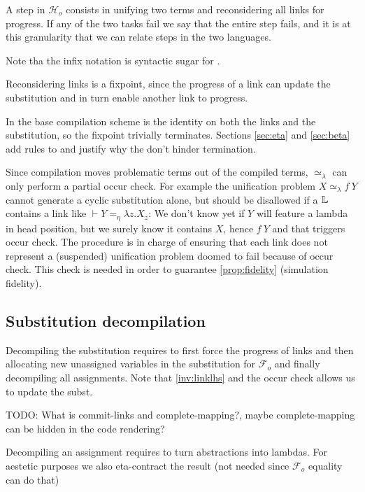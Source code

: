 \documentclass[sigconf,natbib=false,review]{acmart}
\newcommand{\UnifRel}{\ensuremath{\simeq}}
\newcommand{\Ue}{\ensuremath{\UnifRel_\lambda}\xspace}
\newcommand{\Fo}{\ensuremath{\mathcal{F}_{\!o}\xspace}} %
\newcommand{\Ho}{\ensuremath{\mathcal{H}_o}\xspace}
\newcommand{\linketaM}[3]{\ensuremath{#1 \vdash #2 =_\eta #3}}
\begin{document}
A step in \Ho consists in unifying two terms and reconsidering all
links for progress. If any of the two tasks fail we say that the entire step
fails, and it is at this granularity that we can relate steps in the
two languages.




\noindent
Note tha the infix notation \elpiIn{((A ~\Ue~B) C D)} is syntactic sugar for
\elpiIn{((~\Ue\!\!\!~) A B C D)}.

Reconsidering links is a fixpoint, since the progress of a link can update the
substitution and in turn enable another link to progress.



\noindent
In the base compilation scheme  is the identity
on both the links and the substitution, so the fixpoint trivially terminates.
Sections \ref{sec:eta} and \ref{sec:beta} add rules to 
and justify why the don't hinder termination.

Since compilation moves problematic terms out of the compiled terms,
\Ue{} can only perform a partial occur check. For example the
unification problem $X \Ue f~Y$ cannot generate a cyclic substitution alone,
but should be disallowed if a $\mathbb{L}$ contains a link like
$\linketaM{}{Y}{\lambda z.X_z}$: We don't know yet if $Y$ will feature
a lambda in head position, but we surely know it contains $X$, hence
$f~Y$ and that triggers occur check.
The procedure  is in charge of ensuring that
each link does not represent a (suspended) unification problem doomed
to fail because of occur check. This check is needed in order to
guarantee \cref{prop:fidelity} (simulation fidelity).

\subsection{Substitution decompilation}

Decompiling the substitution requires to first force the
progress of links and then allocating new unassigned variables
in the substitution for \Fo{} and finally decompiling all
assignments. Note that \cref{inv:linklhs} and the
occur check allows us to update the subst.




TODO: What is commit-links and complete-mapping?, maybe complete-mapping can be
hidden in the code rendering?

\noindent
Decompiling an assignment requires to turn abstractions into
lambdas. For aestetic purposes we also eta-contract the result
(not needed since \Fo{} equality can do that)
\end{document}
